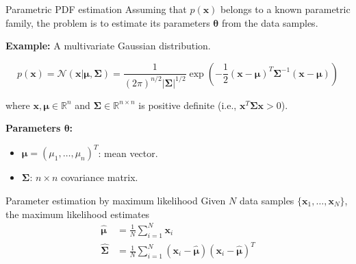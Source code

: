 \documentclass{beamer}
\newcommand{\x}{\mathbf{x}}
\newcommand{\bmu}{\boldsymbol{\mu}}
\newcommand{\bSigma}{\boldsymbol{\Sigma}}
\newcommand{\btheta}{\boldsymbol{\theta}}
\begin{document}
\begin{frame}{Parametric PDF estimation}
Assuming that $p(\x)$ belongs to a known parametric family, the
\alert{problem} is to estimate its parameters $\btheta$ from the data
samples.

\vspace{0.5cm}

\textbf{Example:} A multivariate Gaussian distribution.

$$p(\x) = \mathcal{N}(\x|\bmu, \bSigma) =
\frac{1}{(2\pi)^{n/2}|\bSigma|^{1/2}}
\exp\left(-\frac{1}{2}(\x-\bmu)^T\bSigma^{-1}(\x-\bmu)\right)$$

where $\x, \bmu \in \mathbb{R}^n$ and $\bSigma \in \mathbb{R}^{n
  \times n}$ is positive definite (i.e., $\x^T \bSigma \x > 0$).

\vspace{0.5cm}

\textbf{Parameters $\btheta$:}
\begin{itemize}
\item $\bmu = (\mu_1, \ldots, \mu_n)^T$: mean vector.
\item $\bSigma$: $n \times n$ covariance matrix.
\end{itemize}

\end{frame}

\begin{frame}{Parameter estimation by maximum likelihood}
Given $N$ data samples $\{\x_1, \ldots, \x_N\}$, the maximum
likelihood estimates
\begin{align}
\hat{\bmu}    &= \frac{1}{N}\sum_{i=1}^N \x_i \nonumber \\
\hat{\bSigma} &= \frac{1}{N}\sum_{i=1}^N (\x_i - \hat{\bmu})(\x_i - \hat{\bmu})^T
\nonumber
\end{align}
\end{frame}
\end{document}
